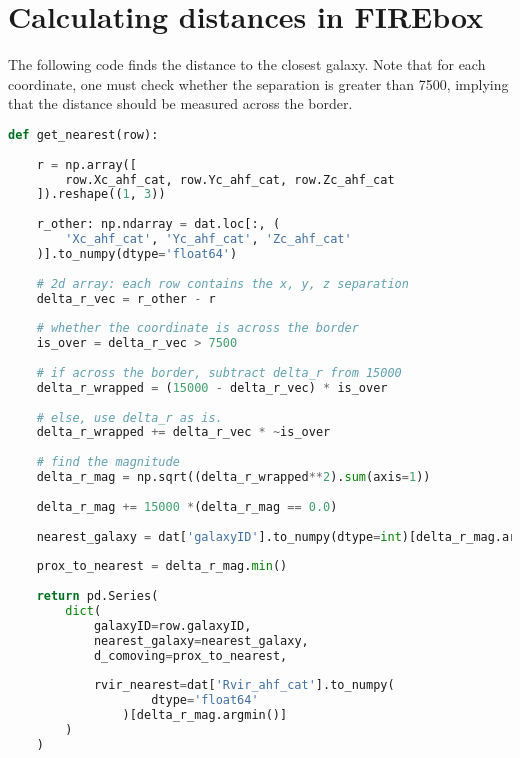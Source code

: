 
\chapter{Calculating distances in FIREbox}
The following code finds the distance to the closest galaxy. Note that for each coordinate, one must check whether the separation is greater than 7500, implying that the distance should be measured across the border.

\begin{lstlisting}[language=Python]
def get_nearest(row):
    
    r = np.array([
        row.Xc_ahf_cat, row.Yc_ahf_cat, row.Zc_ahf_cat
    ]).reshape((1, 3))
    
    r_other: np.ndarray = dat.loc[:, (
        'Xc_ahf_cat', 'Yc_ahf_cat', 'Zc_ahf_cat'
    )].to_numpy(dtype='float64')
    
    # 2d array: each row contains the x, y, z separation
    delta_r_vec = r_other - r
    
    # whether the coordinate is across the border
    is_over = delta_r_vec > 7500
    
    # if across the border, subtract delta_r from 15000
    delta_r_wrapped = (15000 - delta_r_vec) * is_over
    
    # else, use delta_r as is.
    delta_r_wrapped += delta_r_vec * ~is_over
    
    # find the magnitude
    delta_r_mag = np.sqrt((delta_r_wrapped**2).sum(axis=1))
    
    delta_r_mag += 15000 *(delta_r_mag == 0.0)
        
    nearest_galaxy = dat['galaxyID'].to_numpy(dtype=int)[delta_r_mag.argmin()]
    
    prox_to_nearest = delta_r_mag.min()
    
    return pd.Series(
        dict(
            galaxyID=row.galaxyID,
            nearest_galaxy=nearest_galaxy,
            d_comoving=prox_to_nearest,
            
            rvir_nearest=dat['Rvir_ahf_cat'].to_numpy(
                    dtype='float64'
                )[delta_r_mag.argmin()]
        )
    )

    
\end{lstlisting}
